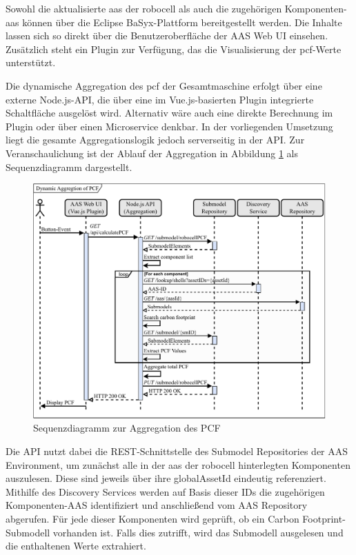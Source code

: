Sowohl die aktualisierte \acs{aas} der robocell als auch die zugehörigen Komponenten-\acs{aas} können über die Eclipse BaSyx-Plattform bereitgestellt werden. 
Die Inhalte lassen sich so direkt über die Benutzeroberfläche der AAS Web UI einsehen. 
Zusätzlich steht ein Plugin zur Verfügung, das die Visualisierung der \acs{pcf}-Werte unterstützt.

Die dynamische Aggregation des \acs{pcf} der Gesamtmaschine erfolgt über eine externe Node.js-API, die über eine im Vue.js-basierten Plugin integrierte Schaltfläche ausgelöst wird. 
Alternativ wäre auch eine direkte Berechnung im Plugin oder über einen Microservice denkbar. 
In der vorliegenden Umsetzung liegt die gesamte Aggregationslogik jedoch serverseitig in der API.
Zur Veranschaulichung ist der Ablauf der Aggregation in Abbildung \ref{fig:SequenzdiagrammPCF}  als Sequenzdiagramm dargestellt.

\begin{figure}[htbp]
    \centering
        \includegraphics[width=1\textwidth]{Bilder/DPP/Sequenzdiagramm.pdf}
    
    \caption{Sequenzdiagramm zur Aggregation des PCF}
    \label{fig:SequenzdiagrammPCF}
\end{figure}

Die API nutzt dabei die REST-Schnittstelle des Submodel Repositories der AAS Environment, um zunächst alle in der \acs{aas} der robocell hinterlegten Komponenten auszulesen. 
Diese sind jeweils über ihre globalAssetId eindeutig referenziert. 
Mithilfe des Discovery Services werden auf Basis dieser IDs die zugehörigen Komponenten-AAS identifiziert und anschließend vom AAS Repository abgerufen. 
Für jede dieser Komponenten wird geprüft, ob ein Carbon Footprint-Submodell vorhanden ist. 
Falls dies zutrifft, wird das Submodell ausgelesen und die enthaltenen Werte extrahiert.

